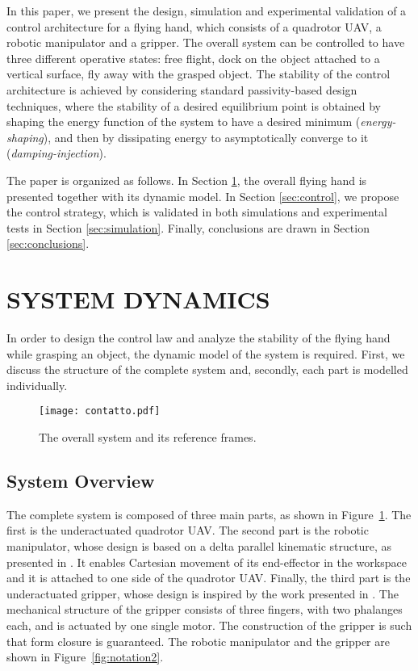 \documentclass[a4paper, 10pt, conference]{ieeeconf}
\begin{document}
In this paper, we present the design, simulation and experimental
validation of a control architecture for a flying hand, which consists of a quadrotor UAV, a robotic
manipulator and a gripper. The overall system can be controlled to have three different operative states: free flight,
dock on the object attached to a vertical surface, fly away with
the grasped object. The stability of the control architecture is achieved by
considering standard passivity-based design techniques, where
the stability of a desired equilibrium point is obtained by shaping
the energy function of the system to have a desired minimum
(\textit{energy-shaping}), and then by dissipating energy to
asymptotically converge to it (\textit{damping-injection}).

The paper is organized as follows. In Section \ref{sec:dynamics}, the
overall flying hand is presented together with its dynamic model. In Section
\ref{sec:control}, we propose the control strategy, which is
validated in both simulations and experimental tests in Section \ref{sec:simulation}. Finally, conclusions are drawn in Section \ref{sec:conclusions}.



\section{SYSTEM DYNAMICS}
\label{sec:dynamics}
In order to design the control law and analyze the stability of the
flying hand while grasping an object, the dynamic model of the system
is required. First, we discuss the structure of the complete
system and, secondly, each part is modelled individually.

\begin{figure}[t]
  \centering
    \texttt{[image: contatto.pdf]}
  \caption{The overall system and its reference frames.}
  \label{fig:notation}
\end{figure}

\subsection{System Overview}
The complete system is composed of three main parts, as shown in Figure~\ref{fig:notation}. The first is the
underactuated quadrotor UAV. The second part is the robotic manipulator, whose design is based on a delta parallel kinematic structure,
as presented in \cite{keemink2012}. It enables Cartesian
movement of its end-effector in the workspace and it is attached to one side of the quadrotor UAV. %
Finally, the third part is the underactuated gripper, whose design is
inspired by the work presented in \cite{underactuated_hands}. The
mechanical structure of the gripper consists of three fingers, with
two phalanges each, and is actuated by one single motor. The
construction of the gripper is such that form closure is
guaranteed. The robotic manipulator and the gripper are
shown in Figure~\ref{fig:notation2}.
\end{document}
